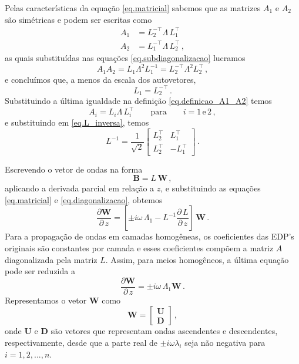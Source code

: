 Pelas caracter\'isticas da equa\c{c}\~ao \ref{eq.matricial} sabemos que as matrizes $A_1$ e $A_2$ s\~ao sim\'etricas e podem ser escritas como
\begin{align*}
A_1&=L_2^{-\top}\Lambda\,L_1^\top\\
A_2&=L_1^{-\top}\Lambda\,L_2^\top\,,
\end{align*}
as quais substitu\'idas nas equa\c{c}\~oes \ref{eq.subdiagonalizacao} lucramos
\begin{equation*}
A_1A_2=L_1\Lambda^2L_1^{-1}=L_2^{-\top}\Lambda^2L_2^\top\,,
\end{equation*}
e conclu\'imos que, a menos da escala dos autovetores,
\begin{equation*}
L_1=L_2^{-\top}\,.
\end{equation*}
Substituindo a \'ultima igualdade na defini\c{c}\~ao \ref{eq.definicao_A1_A2} temos
\begin{equation*}
A_i=L_i\Lambda\,L_i^{\top}\qquad\text{para}\qquad i=1\,\text{e}\,2\,,
\end{equation*}
e substituindo em \ref{eq.L_inversa}, temos
\begin{equation}\label{eq.L_inversa_2}
L^{-1}=\frac{1}{\sqrt{2}}
\begin{bmatrix}
L_2^{\top}&L_1^{\top}\\
L_2^{\top}&-L_1^{\top}
\end{bmatrix}\,.
\end{equation}

Escrevendo o vetor de ondas na forma
\begin{equation}\label{eq.transformacao_B}
\mathbf{B}=L\,\mathbf{W}\,,
\end{equation}
aplicando a derivada parcial em rela\c{c}\~ao a $z$, e substituindo as equa\c{c}\~oes \ref{eq.matricial} e \ref{eq.diagonalizacao}, obtemos
\begin{equation}\label{eq.derivada_W}
\frac{\partial\mathbf{W}}{\partial\,z}=\left[\pm i\omega\,\Lambda_1-L^{-1}\frac{\partial\,L}{\partial\,z}\right]\,\mathbf{W}\,.
\end{equation}
Para a propaga\c{c}\~ao de ondas em camadas homog\^eneas, os coeficientes das EDP's originais s\~ao constantes por camada e esses coeficientes comp\~oem a matriz $A$ diagonalizada pela matriz $L$. Assim, para meios homog\^eneos, a \'ultima equa\c{c}\~ao pode ser reduzida a
\begin{equation*}
\frac{\partial\mathbf{W}}{\partial\,z}=\pm i\omega\,\Lambda_1\mathbf{W}\,.
\end{equation*}
Representamos o vetor $\mathbf{W}$ como
\begin{equation*}
\mathbf{W}=
\begin{bmatrix}
\mathbf{U}\\
\mathbf{D}
\end{bmatrix}\,,
\end{equation*}
onde $\mathbf{U}$ e $\mathbf{D}$ s\~ao vetores que representam ondas ascendentes e descendentes, respectivamente, desde que a parte real de $\pm i\omega\lambda_i$ seja n\~ao negativa para $i=1,2,...,n$.

